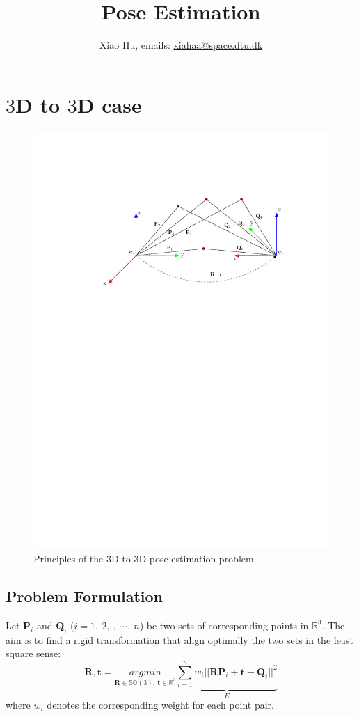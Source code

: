 \documentclass[a4paper]{report}
\begin{document}
\title{Pose Estimation}
\author{Xiao Hu, emails: \url{xiahaa@space.dtu.dk}}
\maketitle
\tableofcontents
\chapter{$3$D to $3$D case}
\begin{figure}
	\centering
	\includegraphics[scale=0.8]{hand_eye_files/vision/figures/p3.pdf}
	\caption{Principles of the $3$D to $3$D pose estimation problem.}
\end{figure}
\section{Problem Formulation}
Let $\mathbf{P}_i$ and $\mathbf{Q}_i$ ($i=1,\ 2,\ ,\ \cdots,\ n$) be two sets of corresponding points in $\mathbb{R}^{3}$. The aim is to find a rigid transformation that align optimally the two sets in the least square sense:
$$
\mathbf{R,t}=\underset{\mathbf{R}\in \mathbb{SO}(3),\ \mathbf{t} \in \mathbb{R}^3}{argmin} \underbrace{\sum_{i=1}^{n} w_i||\mathbf{RP}_i+\mathbf{t}-\mathbf{Q}_i||^2}_{E}
$$
where $w_i$ denotes the corresponding weight for each point pair. 
\end{document}
